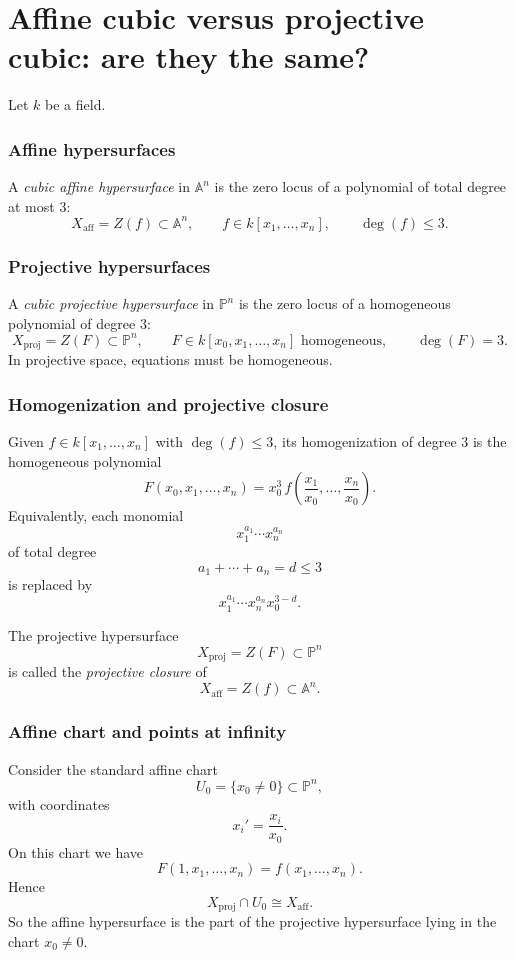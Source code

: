 \documentclass[12pt,a4paper]{article}
\theoremstyle{plain}
\theoremstyle{definition}      %
\begin{document}
\section*{Affine cubic versus projective cubic: are they the same?}

Let $k$ be a field.

\subsubsection*{Affine hypersurfaces}

A \emph{cubic affine hypersurface} in $\mathbb A^n$ is the zero locus of a polynomial of total degree at most $3$:
\[
X_{\mathrm{aff}}
=
Z(f)
\subset
\mathbb A^n,
\qquad
f\in k[x_1,\dots,x_n],
\qquad
\deg(f)\le 3.
\]

\subsubsection*{Projective hypersurfaces}

A \emph{cubic projective hypersurface} in $\mathbb P^n$ is the zero locus of a homogeneous polynomial of degree $3$:
\[
X_{\mathrm{proj}}
=
Z(F)
\subset
\mathbb P^n,
\qquad
F\in k[x_0,x_1,\dots,x_n] \text{ homogeneous},
\qquad
\deg(F)=3.
\]
In projective space, equations must be homogeneous.

\subsubsection*{Homogenization and projective closure}

Given $f\in k[x_1,\dots,x_n]$ with $\deg(f)\le 3$, its homogenization of degree $3$ is the homogeneous polynomial
\[
F(x_0,x_1,\dots,x_n)
=
x_0^{3}\, f\!\left(\frac{x_1}{x_0},\dots,\frac{x_n}{x_0}\right).
\]
Equivalently, each monomial
\[
x_1^{a_1}\cdots x_n^{a_n}
\]
of total degree
\[
a_1+\cdots+a_n=d\le 3
\]
is replaced by
\[
x_1^{a_1}\cdots x_n^{a_n}x_0^{3-d}.
\]

The projective hypersurface
\[
X_{\mathrm{proj}}=Z(F)\subset \mathbb P^n
\]
is called the \emph{projective closure} of
\[
X_{\mathrm{aff}}=Z(f)\subset \mathbb A^n.
\]

\subsubsection*{Affine chart and points at infinity}

Consider the standard affine chart
\[
U_0=\{x_0\neq 0\}\subset \mathbb P^n,
\]
with coordinates
\[
x_i'=\frac{x_i}{x_0}.
\]
On this chart we have
\[
F(1,x_1,\dots,x_n)=f(x_1,\dots,x_n).
\]
Hence
\[
X_{\mathrm{proj}}\cap U_0
\cong
X_{\mathrm{aff}}.
\]
So the affine hypersurface is the part of the projective hypersurface lying in the chart $x_0\neq 0$.
\end{document}
